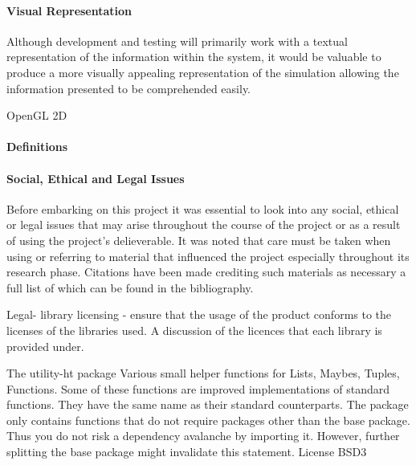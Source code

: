 \documentclass[main.tex]{subfiles}
\begin{document}
{{\paragraph{Visual Representation} 

Although development and testing will primarily work with a textual representation of the information within the system, it would be valuable to produce a more visually appealing representation of the simulation allowing the information presented to be comprehended easily. 


OpenGL
2D

\paragraph{Definitions}


\paragraph{Social, Ethical and Legal Issues} Before embarking on this project it was essential to look into any social, ethical or legal issues that may arise throughout the course of the project or as a result of using the project's delieverable. It was noted that care must be taken when using or referring to material that influenced the project especially throughout its research phase. Citations have been made crediting such materials as necessary a full list of which can be found in the bibliography.

Legal- library licensing - ensure that the usage of the product conforms to the licenses of the libraries used.
A discussion of the licences that each library is provided under.

The utility-ht package
Various small helper functions for Lists, Maybes, Tuples, Functions. Some of these functions are improved implementations of standard functions. They have the same name as their standard counterparts. The package only contains functions that do not require packages other than the base package. Thus you do not risk a dependency avalanche by importing it. However, further splitting the base package might invalidate this statement.
License	BSD3

}}
\end{document}
